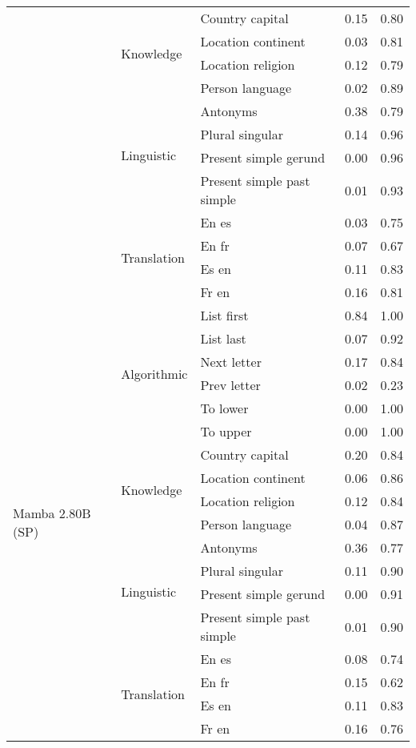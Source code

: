 \begin{center}
\begin{longtable}{lllrr}
 & \multirow[t]{4}{*}{Knowledge} & Country capital & 0.15 & 0.80 \\
 &  & Location continent & 0.03 & 0.81 \\
 &  & Location religion & 0.12 & 0.79 \\
 &  & Person language & 0.02 & 0.89 \\
\cline{2-5}
 & \multirow[t]{4}{*}{Linguistic} & Antonyms & 0.38 & 0.79 \\
 &  & Plural singular & 0.14 & 0.96 \\
 &  & Present simple gerund & 0.00 & 0.96 \\
 &  & Present simple past simple & 0.01 & 0.93 \\
\cline{2-5}
 & \multirow[t]{4}{*}{Translation} & En es & 0.03 & 0.75 \\
 &  & En fr & 0.07 & 0.67 \\
 &  & Es en & 0.11 & 0.83 \\
 &  & Fr en & 0.16 & 0.81 \\
\cline{1-5} \cline{2-5}
\multirow[t]{18}{*}{Mamba 2.80B (SP)} & \multirow[t]{6}{*}{Algorithmic} & List first & 0.84 & 1.00 \\
 &  & List last & 0.07 & 0.92 \\
 &  & Next letter & 0.17 & 0.84 \\
 &  & Prev letter & 0.02 & 0.23 \\
 &  & To lower & 0.00 & 1.00 \\
 &  & To upper & 0.00 & 1.00 \\
\cline{2-5}
 & \multirow[t]{4}{*}{Knowledge} & Country capital & 0.20 & 0.84 \\
 &  & Location continent & 0.06 & 0.86 \\
 &  & Location religion & 0.12 & 0.84 \\
 &  & Person language & 0.04 & 0.87 \\
\cline{2-5}
 & \multirow[t]{4}{*}{Linguistic} & Antonyms & 0.36 & 0.77 \\
 &  & Plural singular & 0.11 & 0.90 \\
 &  & Present simple gerund & 0.00 & 0.91 \\
 &  & Present simple past simple & 0.01 & 0.90 \\
\cline{2-5}
 & \multirow[t]{4}{*}{Translation} & En es & 0.08 & 0.74 \\
 &  & En fr & 0.15 & 0.62 \\
 &  & Es en & 0.11 & 0.83 \\
 &  & Fr en & 0.16 & 0.76 \\

\end{longtable}
\end{center}
